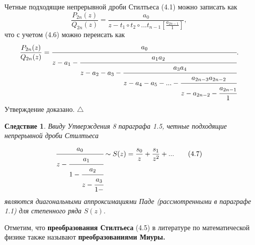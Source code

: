\documentclass[12 pt, a4 paper]{article}
\theoremstyle{plain}   \newtheorem{Pro}{Задача}
\newtheorem{Cor}{Следствие}
\begin{document}
Четные подходящие непрерывной дроби Стилтьеса (4.1)
можно записать как
\begin{equation*}
  \frac{P_{2n}(z)}{Q_{2n}(z)}=
  \frac{a_0}
  {z-t_1 \circ t_2 \circ ... t_{n-1}
  [\frac{a_{2n-1}}{1}]},
\end{equation*}
что с учетом (4.6) можно переисать как
\begin{equation*}
  \frac{P_{2n}(z)}{Q_{2n}(z)}=
    \cfrac{a_0}{z-a_1 -
	  \cfrac{a_1 a_2}{z-a_2 -a_3 -
	    \cfrac{a_3 a_4}{z-a_4 -a_5 -...-
		  \cfrac{a_{2n-3}a_{2n-2}}{z-a_{2n-2}-
		    \cfrac{a_{2n-1}}{1
	}}}}}.
\end{equation*}
Утверждение доказано. $ \triangle $
\begin{Cor}
Ввиду Утверждения 8 параграфа 1.5,
четные подходящие непрерывной дроби Стилтьеса
\begin{equation*}
  \cfrac{a_0}{z-
    \cfrac{a_1}{1-
	  \cfrac{a_2}{z-
	    \cfrac{a_3}{1-
  }}}}
  \sim S(z)=\frac{s_0}{z}+\frac{s_1}{z^2}+...
  \qquad (4.7)
\end{equation*}
являются диагональными аппроксимациями Паде
(рассмотренными в параграфе 1.1)
для степенного ряда
$ S(z). $
\end{Cor}
Отметим, что
{\bfseries преобразования Стилтьеса}
(4.5) в литературе по математической физике также называют
{\bfseries преобразованиями Миуры.}
\newpage
\end{document}
